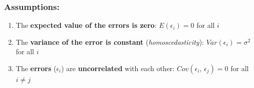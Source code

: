 \documentclass[10pt]{beamer} %
\begin{document}
\begin{frame}
   \frametitle{Assumptions: }
   \begin{enumerate}

      \item The \textbf{expected value of the errors is zero}: $E(\epsilon_{i}) = 0$ for all $i$ 
         \vspace{0.5cm}



      \item The \textbf{variance of the error is constant}
         (\emph{homoscedasticity}): $Var(\epsilon_i)=\sigma^2$ for all
         $i$
         \vspace{0.5cm}
      \item The \textbf{errors} ($\epsilon_i$) are \textbf{uncorrelated} with
         each other: $Cov(\epsilon_i,\, \epsilon_j) = 0$ for all $i\neq j$


   \end{enumerate}	
\end{frame}
\end{document}
